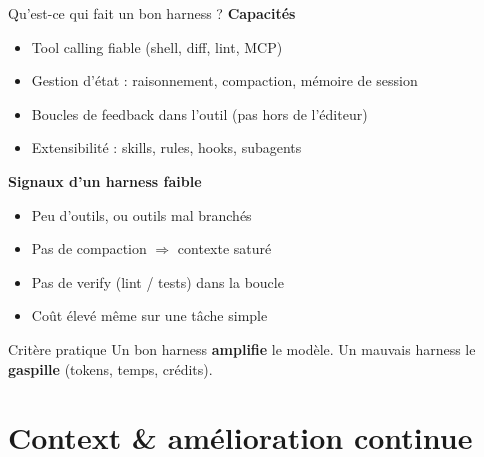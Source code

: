 \documentclass[aspectratio=169]{beamer}
\begin{document}
\begin{frame}{Qu'est-ce qui fait un bon harness ?}
    \textbf{Capacités}
    \begin{itemize}
        \item Tool calling fiable (shell, diff, lint, MCP)
        \item Gestion d'état : raisonnement, compaction, mémoire de session
        \item Boucles de feedback dans l'outil (pas hors de l'éditeur)
        \item Extensibilité : skills, rules, hooks, subagents
    \end{itemize}
    \vspace{0.25cm}
    \textbf{Signaux d'un harness faible}
    \begin{itemize}
        \item Peu d'outils, ou outils mal branchés
        \item Pas de compaction $\Rightarrow$ contexte saturé
        \item Pas de verify (lint / tests) dans la boucle
        \item Coût élevé même sur une tâche simple
    \end{itemize}
    \vspace{0.35cm}
    \begin{block}{Critère pratique}
        Un bon harness \textbf{amplifie} le modèle.
        Un mauvais harness le \textbf{gaspille} (tokens, temps, crédits).
    \end{block}
\end{frame}

\section{Context \& amélioration continue}
\end{document}
